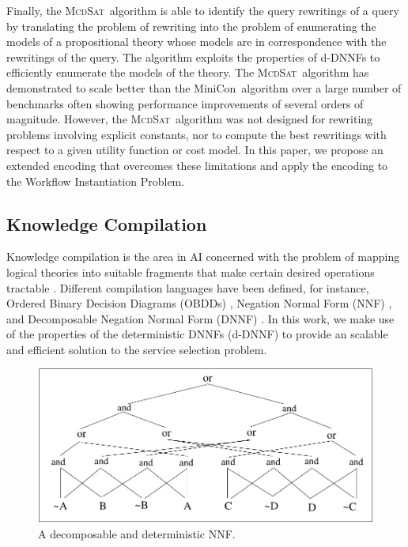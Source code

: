 \documentclass{llncs}
\newcommand{\mcdsat}{\textsc{McdSat}}
\newcommand{\minicon}{{MiniCon}}
\begin{document}
Finally, the \mcdsat\ algorithm is able to identify the query rewritings of a query by
translating the problem of rewriting into the problem of enumerating the models of a
propositional theory whose models are in correspondence with the rewritings of the query.
The algorithm exploits the properties of d-DNNFs to efficiently enumerate the models of
the theory.
The \mcdsat\ algorithm has demonstrated to scale better than the \minicon\ algorithm over
a large number of benchmarks often showing performance improvements of several orders of
magnitude. However, the \mcdsat\ algorithm was not designed for rewriting problems
involving explicit constants, nor to compute the best rewritings with respect to a given
utility function or cost model. In this paper, we propose an extended encoding that 
overcomes these limitations and apply the encoding to the Workflow Instantiation Problem.

\subsection{Knowledge Compilation}

Knowledge compilation is the area in AI concerned with the problem of mapping
logical theories into suitable fragments that make certain desired operations
tractable \cite{cadoli:compilation}. Different compilation languages have been
defined, for instance, Ordered Binary Decision Diagrams (OBDDs) \cite{bryant:obdd},
Negation Normal Form (NNF) \cite{barwise:handbook}, and Decomposable Negation
Normal Form (DNNF) \cite{darwiche:map}. In this work, we make use of the properties
of the deterministic DNNFs (d-DNNF) \cite{darwiche:d-dnnfs} to provide an scalable
and efficient solution to the service selection problem. 

\begin{figure}[t]
\centering
\includegraphics[width=.7\textwidth]{odd}
\caption{A decomposable and deterministic NNF.}
\label{fig:dnnf}
\end{figure}
\end{document}
